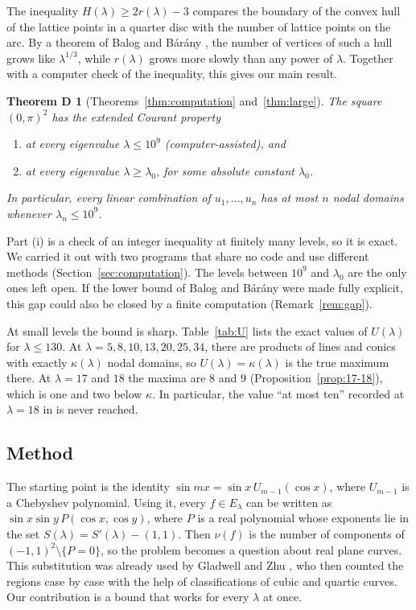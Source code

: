\documentclass[11pt]{amsart}
\newtheorem*{mainD}{Theorem D}
\theoremstyle{definition}
\theoremstyle{remark}
\newcommand{\SweepX}{10^9}
\numberwithin{equation}{section}
\begin{document}
The inequality $H(\lambda)\ge2r(\lambda)-3$ compares the boundary of the convex hull of the
lattice points in a quarter disc with the number of lattice points on the arc. By a theorem of
Balog and B\'ar\'any \cite{BalogBarany}, the number of vertices of such a hull grows like
$\lambda^{1/3}$, while $r(\lambda)$ grows more slowly than any power of $\lambda$. Together with
a computer check of the inequality, this gives our main result.

\begin{mainD}[Theorems~\ref{thm:computation} and~\ref{thm:large}]
The square $(0,\pi)^2$ has the extended Courant property
\begin{enumerate}[label=(\roman*),nosep]
\item at every eigenvalue $\lambda\le\SweepX$ (computer-assisted), and
\item at every eigenvalue $\lambda\ge\lambda_0$, for some absolute constant $\lambda_0$.
\end{enumerate}
In particular, every linear combination of $u_1,\dots,u_n$ has at most $n$ nodal domains
whenever $\lambda_n\le\SweepX$.
\end{mainD}

Part (i) is a check of an integer inequality at finitely many levels, so it is exact. We carried
it out with two programs that share no code and use different methods (Section~\ref{sec:computation}). The
levels between $\SweepX$ and $\lambda_0$ are the only ones left open. If the lower bound of
Balog and B\'ar\'any were made fully explicit, this gap could also be closed by a finite
computation (Remark~\ref{rem:gap}).

At small levels the bound is sharp. Table~\ref{tab:U} lists the exact values of $U(\lambda)$ for
$\lambda\le130$. At $\lambda=5,8,10,13,20,25,34$, there are products of lines and conics with
exactly $\kappa(\lambda)$ nodal domains, so $U(\lambda)=\kappa(\lambda)$ is the true maximum
there. At $\lambda=17$ and $18$ the maxima are $8$ and $9$ (Proposition~\ref{prop:17-18}),
which is one and two below $\kappa$. In particular, the value ``at most ten'' recorded at
$\lambda=18$ in \cite{ZhuThesis} is never reached.

\subsection{Method}

The starting point is the identity $\sin mx=\sin x\,U_{m-1}(\cos x)$, where $U_{m-1}$ is a
Chebyshev polynomial. Using it, every $f\in E_\lambda$ can be written as
$\sin x\sin y\,P(\cos x,\cos y)$, where $P$ is a real polynomial whose exponents lie in the set
$S(\lambda)=S'(\lambda)-(1,1)$. Then $\nu(f)$ is the number of components of
$(-1,1)^2\setminus\{P=0\}$, so the problem becomes a question about real plane curves. This
substitution was already used by Gladwell and Zhu \cite{GladwellZhu,ZhuThesis}, who then
counted the regions case by case with the help of classifications of cubic and quartic curves.
Our contribution is a bound that works for every $\lambda$ at once.
\end{document}

